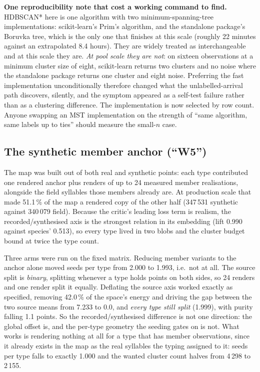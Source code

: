 \documentclass[10pt,twocolumn,a4paper]{article}
\begin{document}
\textbf{One reproducibility note that cost a working command to find.} HDBSCAN* here is one
algorithm with two minimum-spanning-tree implementations: scikit-learn's Prim's algorithm,
and the standalone package's Boruvka tree, which is the only one that finishes at this scale
(roughly 22 minutes against an extrapolated 8.4 hours). They are widely treated as
interchangeable and at this scale they are. \emph{At pool scale they are not}: on sixteen
observations at a minimum cluster size of eight, scikit-learn returns two clusters and no
noise where the standalone package returns one cluster and eight noise. Preferring the fast
implementation unconditionally therefore changed what the unlabelled-arrival path
discovers, silently, and the symptom appeared as a self-test failure rather than as a
clustering difference. The implementation is now selected by row count. Anyone swapping an
MST implementation on the strength of ``same algorithm, same labels up to ties'' should
measure the small-$n$ case.

\subsection{The synthetic member anchor (``W5'')}

The map was built out of both real and synthetic points: each type contributed one rendered
anchor plus renders of up to 24 measured member realisations, alongside the field syllables
those members already are. At production scale that made 51.1\,\% of the map a rendered copy
of the other half (347\,531 synthetic against 340\,079 field). Because the critic's leading
loss term is realism, the recorded/synthesised axis is the strongest relation in its
embedding (lift 0.990 against species' 0.513), so every type lived in two blobs and the
cluster budget bound at twice the type count.

Three arms were run on the fixed matrix. Reducing member variants to the anchor alone moved
seeds per type from 2.000 to 1.993, i.e.\ not at all. The source split is
\emph{binary}, splitting whenever a type holds points on both sides, so 24 renders and one
render split it equally. Deflating the source axis worked exactly as specified, removing
42.0\,\% of the space's energy and driving the gap between the two source means from 7.233 to
0.0, and \emph{every type still split} (1.999), with purity falling 1.1 points. So the
recorded/synthesised difference is not one direction: the global offset is, and the per-type
geometry the seeding gates on is not. What works is rendering nothing at all for a type
that has member observations, since it already exists in the map as the real syllables the
typing assigned to it: seeds per type falls to exactly 1.000 and the wanted cluster count
halves from 4\,298 to 2\,155.
\end{document}
